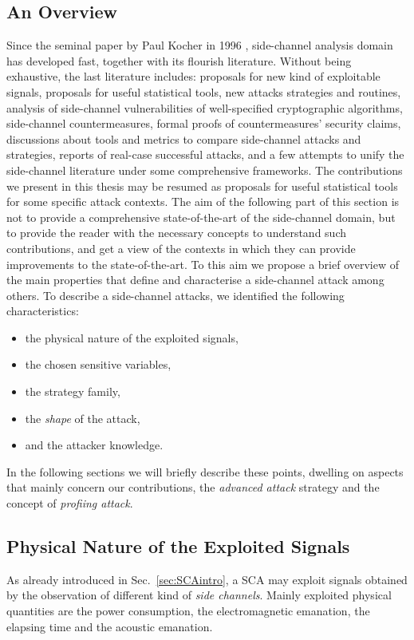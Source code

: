 \subsection{An Overview}
Since the seminal paper by Paul Kocher in 1996 \cite{kocher1996timing}, side-channel analysis domain has developed fast, together with its flourish literature. Without being exhaustive, the last literature includes: proposals for new kind of exploitable signals, proposals for useful statistical tools, new attacks strategies and routines, analysis of side-channel vulnerabilities of well-specified cryptographic algorithms, side-channel countermeasures, formal proofs of countermeasures' security claims, discussions about tools and metrics to compare side-channel attacks and strategies, reports of real-case successful attacks, and a few attempts to unify the side-channel literature under some comprehensive frameworks. The contributions we present in this thesis may be resumed as proposals for useful statistical tools for some specific attack contexts. The aim of the following part of this section is not to provide a comprehensive state-of-the-art of the side-channel domain, but to provide the reader with the necessary concepts to understand such contributions, and get a view of the contexts in which they can provide improvements to the state-of-the-art. To this aim we propose a brief overview of the main properties that define and characterise a side-channel attack among others. To describe a side-channel attacks, we identified  the following characteristics: 
\begin{itemize}
\item the physical nature of the exploited signals,
\item the chosen sensitive variables,
\item the strategy family,
\item the \emph{shape} of the attack,
\item and the attacker knowledge.
\end{itemize} 

In the following sections we will briefly describe these points, dwelling on aspects that  mainly concern our contributions, \ie the \emph{advanced attack} strategy and the concept of \emph{profiing attack}. 

\subsection{Physical Nature of the Exploited Signals}\label{sec:physical_signals}
As already introduced in Sec.~\ref{sec:SCAintro}, a SCA may exploit signals obtained by the observation of different kind of \emph{side channels}. Mainly exploited physical quantities are the power consumption, the electromagnetic emanation, the elapsing time and the acoustic emanation. 

